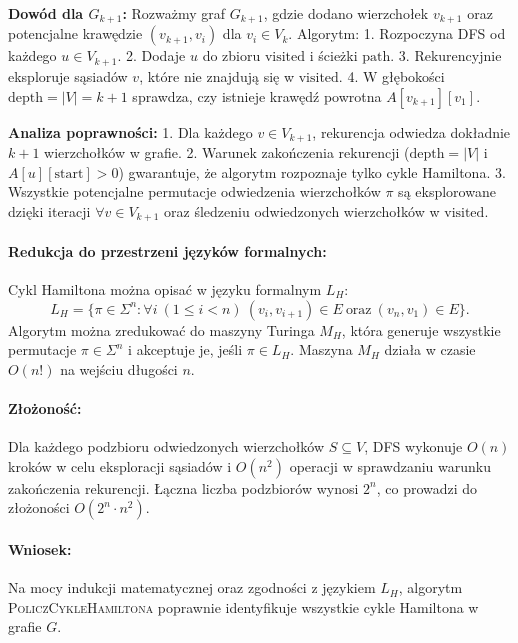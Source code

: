 \textbf{Dowód dla \( G_{k+1} \):}
Rozważmy graf \( G_{k+1} \), gdzie dodano wierzchołek \( v_{k+1} \) oraz potencjalne krawędzie \( (v_{k+1}, v_i) \) dla \( v_i \in V_k \). Algorytm:
1. Rozpoczyna DFS od każdego \( u \in V_{k+1} \).
2. Dodaje \( u \) do zbioru \( \text{visited} \) i ścieżki \( \text{path} \).
3. Rekurencyjnie eksploruje sąsiadów \( v \), które nie znajdują się w \( \text{visited} \).
4. W głębokości \( \text{depth} = |V| = k+1 \) sprawdza, czy istnieje krawędź powrotna \( A[v_{k+1}][v_1] \).

\textbf{Analiza poprawności:}
1. Dla każdego \( v \in V_{k+1} \), rekurencja odwiedza dokładnie \( k+1 \) wierzchołków w grafie.
2. Warunek zakończenia rekurencji (\( \text{depth} = |V| \) i \( A[u][\text{start}] > 0 \)) gwarantuje, że algorytm rozpoznaje tylko cykle Hamiltona.
3. Wszystkie potencjalne permutacje odwiedzenia wierzchołków \( \pi \) są eksplorowane dzięki iteracji \( \forall v \in V_{k+1} \) oraz śledzeniu odwiedzonych wierzchołków w \( \text{visited} \).

\paragraph{Redukcja do przestrzeni języków formalnych:}
Cykl Hamiltona można opisać w języku formalnym \( L_H \):
\[
L_H = \{\pi \in \Sigma^n : \forall i \ (1 \leq i < n) \ (v_i, v_{i+1}) \in E \ \text{oraz} \ (v_n, v_1) \in E\}.
\]
Algorytm można zredukować do maszyny Turinga \( M_H \), która generuje wszystkie permutacje \( \pi \in \Sigma^n \) i akceptuje je, jeśli \( \pi \in L_H \). Maszyna \( M_H \) działa w czasie \( O(n!) \) na wejściu długości \( n \).

\paragraph{Złożoność:}
Dla każdego podzbioru odwiedzonych wierzchołków \( S \subseteq V \), DFS wykonuje \( O(n) \) kroków w celu eksploracji sąsiadów i \( O(n^2) \) operacji w sprawdzaniu warunku zakończenia rekurencji. Łączna liczba podzbiorów wynosi \( 2^n \), co prowadzi do złożoności \( O(2^n \cdot n^2) \).

\paragraph{Wniosek:}
Na mocy indukcji matematycznej oraz zgodności z językiem \( L_H \), algorytm \textsc{PoliczCykleHamiltona} poprawnie identyfikuje wszystkie cykle Hamiltona w grafie \( G \).


